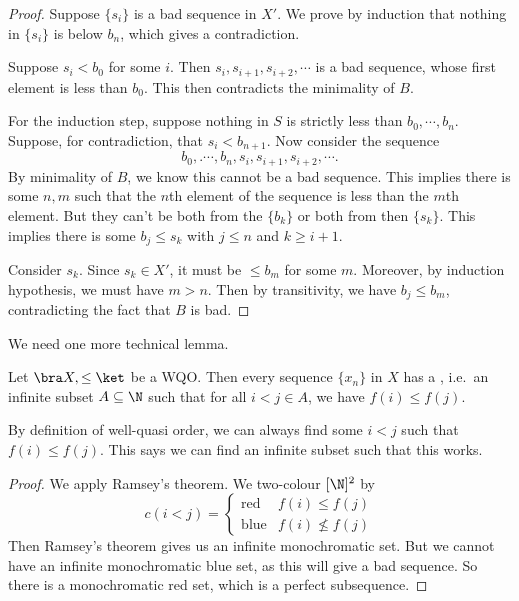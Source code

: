 \documentclass[a4paper]{article}
\begin{document}
\begin{proof}
  Suppose $\{s_i\}$ is a bad sequence in $X'$. We prove by induction that nothing in $\{s_i\}$ is below $b_n$, which gives a contradiction.

  Suppose $s_i < b_0$ for some $i$. Then $s_i, s_{i + 1}, s_{i + 2}, \cdots$ is a bad sequence, whose first element is less than $b_0$. This then contradicts the minimality of $B$.

  For the induction step, suppose nothing in $S$ is strictly less than $b_0, \cdots, b_n$. Suppose, for contradiction, that $s_i < b_{n + 1}$. Now consider the sequence
  \[
    b_0,. \cdots, b_n, s_i, s_{i + 1}, s_{i + 2}, \cdots.
  \]
  By minimality of $B$, we know this cannot be a bad sequence. This implies there is some $n, m$ such that the $n$th element of the sequence is less than the $m$th element. But they can't be both from the $\{b_k\}$ or both from then $\{s_k\}$. This implies there is some $b_j \leq s_k$ with $j \leq n$ and $k \geq i + 1$.

  Consider $s_k$. Since $s_k \in X'$, it must be $\leq b_m$ for some $m$. Moreover, by induction hypothesis, we must have $m > n$. Then by transitivity, we have $b_j \leq b_m$, contradicting the fact that $B$ is bad.
\end{proof}

We need one more technical lemma.

\begin{lemma}
  Let $\bra X, \leq\ket$ be a WQO. Then every sequence $\{x_n\}$ in $X$ has a , i.e.\ an infinite subset $A \subseteq \N$ such that for all $i < j \in A$, we have $f(i) \leq f(j)$.
\end{lemma}
By definition of well-quasi order, we can always find some $i < j$ such that $f(i) \leq f(j)$. This says we can find an infinite subset such that this works.

\begin{proof}
  We apply Ramsey's theorem. We two-colour $[\N]^2$ by
  \[
    c(i < j) =
    \begin{cases}
      \mathrm{red} & f(i) \leq f(j)\\
      \mathrm{blue} & f(i) \not\leq f(j)
    \end{cases}
  \]
  Then Ramsey's theorem gives us an infinite monochromatic set. But we cannot have an infinite monochromatic blue set, as this will give a bad sequence. So there is a monochromatic red set, which is a perfect subsequence.
\end{proof}
\end{document}
